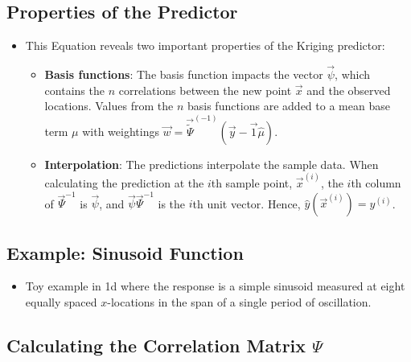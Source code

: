 \documentclass[
  letterpaper,
  DIV=11,
  numbers=noendperiod]{scrreprt}
\providecommand{\tightlist}{%
  \setlength{\itemsep}{0pt}\setlength{\parskip}{0pt}}\usepackage{longtable,booktabs,array}
\begin{document}
\hypertarget{properties-of-the-predictor}{%
\subsection{Properties of the
Predictor}\label{properties-of-the-predictor}}

\begin{itemize}
\tightlist
\item
  This Equation reveals two important properties of the Kriging
  predictor:

  \begin{itemize}
  \tightlist
  \item
    \textbf{Basis functions}: The basis function impacts the vector
    \(\vec{\psi}\), which contains the \(n\) correlations between the
    new point \(\vec{x}\) and the observed locations. Values from the
    \(n\) basis functions are added to a mean base term \(\mu\) with
    weightings
    \(\vec{w} = \vec{\tilde{\Psi}}^{(-1)} (\vec{y} - \vec{1}\hat{\mu})\).
  \item
    \textbf{Interpolation}: The predictions interpolate the sample data.
    When calculating the prediction at the \(i\)th sample point,
    \(\vec{x}^{(i)}\), the \(i\)th column of \(\vec{\Psi}^{-1}\) is
    \(\vec{\psi}\), and \(\vec{\psi} \vec{\Psi}^{-1}\) is the \(i\)th
    unit vector. Hence, \(\hat{y}(\vec{x}^{(i)}) = y^{(i)}\).
  \end{itemize}
\end{itemize}

\hypertarget{example-sinusoid-function}{%
\subsection{Example: Sinusoid
Function}\label{example-sinusoid-function}}

\begin{itemize}
\tightlist
\item
  Toy example in 1d where the response is a simple sinusoid measured at
  eight equally spaced \(x\)-locations in the span of a single period of
  oscillation.
\end{itemize}

\hypertarget{calculating-the-correlation-matrix-psi}{%
\subsection{\texorpdfstring{Calculating the Correlation Matrix
\(\Psi\)}{Calculating the Correlation Matrix \textbackslash Psi}}\label{calculating-the-correlation-matrix-psi}}
\end{document}
